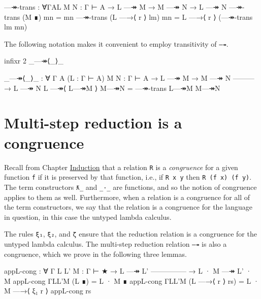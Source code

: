 \begin{fence}
\begin{code}
—↠-trans : ∀{Γ}{A}{L M N : Γ ⊢ A}
         → L —↠ M
         → M —↠ N
         → L —↠ N
—↠-trans (M ∎) mn = mn
—↠-trans (L —→⟨ r ⟩ lm) mn = L —→⟨ r ⟩ (—↠-trans lm mn)
\end{code}
\end{fence}

The following notation makes it convenient to employ transitivity of
\texttt{—↠}.

\begin{fence}
\begin{code}
infixr 2 _—↠⟨_⟩_

_—↠⟨_⟩_ : ∀ {Γ A} (L : Γ ⊢ A) {M N : Γ ⊢ A}
    → L —↠ M
    → M —↠ N
      ---------
    → L —↠ N
L —↠⟨ L—↠M ⟩ M—↠N = —↠-trans L—↠M M—↠N
\end{code}
\end{fence}

\hypertarget{multi-step-reduction-is-a-congruence}{%
\section{Multi-step reduction is a
congruence}\label{multi-step-reduction-is-a-congruence}}

Recall from Chapter \protect\hyperlink{Induction}{Induction} that a
relation \texttt{R} is a \emph{congruence} for a given function
\texttt{f} if it is preserved by that function, i.e., if
\texttt{R\ x\ y} then \texttt{R\ (f\ x)\ (f\ y)}. The term constructors
\texttt{ƛ\_} and \texttt{\_·\_} are functions, and so the notion of
congruence applies to them as well. Furthermore, when a relation is a
congruence for all of the term constructors, we say that the relation is
a congruence for the language in question, in this case the untyped
lambda calculus.

The rules \texttt{ξ₁}, \texttt{ξ₂}, and \texttt{ζ} ensure that the
reduction relation is a congruence for the untyped lambda calculus. The
multi-step reduction relation \texttt{—↠} is also a congruence, which we
prove in the following three lemmas.

\begin{fence}
\begin{code}
appL-cong : ∀ {Γ} {L L' M : Γ ⊢ ★}
         → L —↠ L'
           ---------------
         → L · M —↠ L' · M
appL-cong {Γ}{L}{L'}{M} (L ∎) = L · M ∎
appL-cong {Γ}{L}{L'}{M} (L —→⟨ r ⟩ rs) = L · M —→⟨ ξ₁ r ⟩ appL-cong rs
\end{code}
\end{fence}

